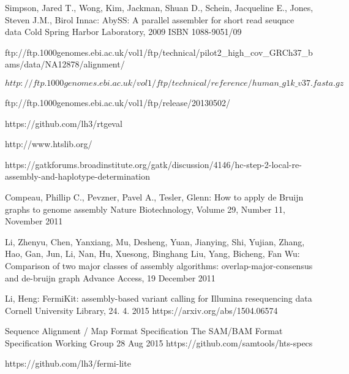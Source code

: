 \begin{thebibliography}{99}

Simpson, Jared T., Wong, Kim, Jackman, Shuan D., Schein, Jacqueline E., Jones, Steven J.M., Birol Innac: 
AbySS: A parallel assembler for short read seuqnce data
Cold Spring Harbor Laboratory, 2009
ISBN 1088-9051/09

ftp://ftp.1000genomes.ebi.ac.uk/vol1/ftp/technical/pilot2\_high\_cov\_GRCh37\_bams/data/NA12878/alignment/

$http://ftp.1000genomes.ebi.ac.uk/vol1/ftp/technical/reference/human\_g1k\_v37.fasta.gz$

ftp://ftp.1000genomes.ebi.ac.uk/vol1/ftp/release/20130502/

https://github.com/lh3/rtgeval

http://www.htslib.org/

https://gatkforums.broadinstitute.org/gatk/discussion/4146/hc-step-2-local-re-assembly-and-haplotype-determination

Compeau, Phillip C., Pevzner, Pavel A., Tesler, Glenn:
How to apply de Bruijn graphs to genome assembly
Nature Biotechnology, Volume 29, Number 11, November 2011

Li, Zhenyu, Chen, Yanxiang, Mu, Desheng, Yuan, Jianying, Shi, Yujian, Zhang, Hao, Gan, Jun, Li, Nan, Hu, Xuesong, Binghang Liu, Yang, Bicheng, Fan Wu:
Comparison of two major classes of assembly algorithms: overlap-major-consensus and de-bruijn graph
Advance Access, 19 December 2011

Li, Heng: FermiKit: assembly-based variant calling for Illumina resequencing data
Cornell University Library, 24. 4. 2015
https://arxiv.org/abs/1504.06574

Sequence Alignment / Map Format Specification
The SAM/BAM Format Specification Working Group
28 Aug 2015
https://github.com/samtools/hts-specs

https://github.com/lh3/fermi-lite


\end{thebibliography}
